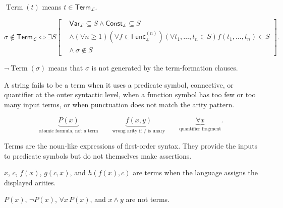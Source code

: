 \begin{remark*}
\(\operatorname{Term}(t)\) means \(t\in\mathsf{Term}_{\mathcal L}\).
\end{remark*}

\begin{remark*}
\[
\sigma\notin\mathsf{Term}_{\mathcal L}
\Longleftrightarrow
\exists S
\left[
\begin{aligned}
&\mathsf{Var}_{\mathcal L}\subseteq S
\land
\mathsf{Const}_{\mathcal L}\subseteq S\\
&\land
(\forall n\geq 1)(\forall f\in\mathsf{Func}_{\mathcal L}^{(n)})
(\forall t_1,\ldots,t_n\in S)
f(t_1,\ldots,t_n)\in S\\
&\land\ \sigma\notin S
\end{aligned}
\right].
\]
\end{remark*}

\begin{remark*}
\(\neg\operatorname{Term}(\sigma)\) means that \(\sigma\) is not generated by
the term-formation clauses.
\end{remark*}

\begin{remark*}
A string fails to be a term when it uses a predicate symbol, connective, or
quantifier at the outer syntactic level, when a function symbol has too few or
too many input terms, or when punctuation does not match the arity pattern.
\end{remark*}

\begin{remark*}
\[
\underbrace{P(x)}_{\text{atomic formula, not a term}}
\qquad
\underbrace{f(x,y)}_{\text{wrong arity if }f\text{ is unary}}
\qquad
\underbrace{\forall x}_{\text{quantifier fragment}}.
\]
\end{remark*}

\begin{remark*}[Interpretation]
Terms are the noun-like expressions of first-order syntax. They provide the
inputs to predicate symbols but do not themselves make assertions.
\end{remark*}

\begin{remark*}[Examples]
\(x\), \(c\), \(f(x)\), \(g(c,x)\), and \(h(f(x),c)\) are terms when the
language assigns the displayed arities.
\end{remark*}

\begin{remark*}
\(P(x)\), \(\neg P(x)\), \(\forall x\,P(x)\), and \(x\land y\) are not terms.
\end{remark*}

